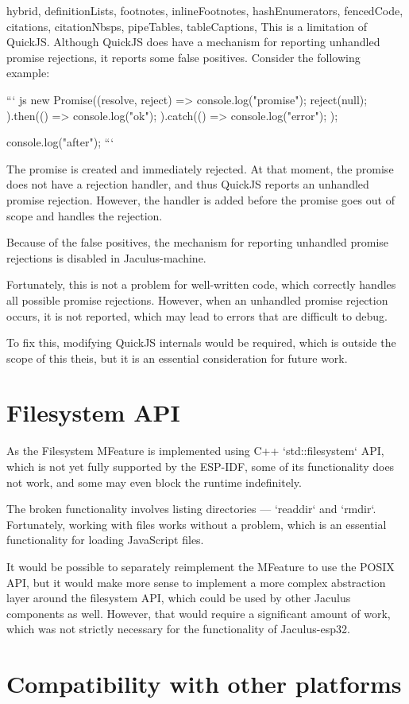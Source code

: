\begin{markdown*}{%
  hybrid,
  definitionLists,
  footnotes,
  inlineFootnotes,
  hashEnumerators,
  fencedCode,
  citations,
  citationNbsps,
  pipeTables,
  tableCaptions,
}
This is a limitation of QuickJS. Although QuickJS does have a mechanism for reporting unhandled promise rejections, it reports some false positives. Consider the following example:

``` js
new Promise((resolve, reject) => {
  console.log("promise");
  reject(null);
}).then(() => {
  console.log("ok");
}).catch(() => {
  console.log("error");
});

console.log("after");
```

The promise is created and immediately rejected. At that moment, the promise does not have a rejection handler, and thus QuickJS reports an unhandled promise rejection. However, the handler is added before the promise goes out of scope and handles the rejection.

Because of the false positives, the mechanism for reporting unhandled promise rejections is disabled in Jaculus-machine.

Fortunately, this is not a problem for well-written code, which correctly handles all possible promise rejections. However, when an unhandled promise rejection occurs, it is not reported, which may lead to errors that are difficult to debug.

To fix this, modifying QuickJS internals would be required, which is outside the scope of this theis, but it is an essential consideration for future work.


\section{Filesystem API}

As the Filesystem MFeature is implemented using C++ `std::filesystem` API, which is not yet fully supported by the ESP-IDF, some of its functionality does not work, and some may even block the runtime indefinitely.

The broken functionality involves listing directories --- `readdir` and `rmdir`. Fortunately, working with files works without a problem, which is an essential functionality for loading JavaScript files.

It would be possible to separately reimplement the MFeature to use the POSIX API, but it would make more sense to implement a more complex abstraction layer around the filesystem API, which could be used by other Jaculus components as well. However, that would require a significant amount of work, which was not strictly necessary for the functionality of Jaculus-esp32.

\section{Compatibility with other platforms}


\end{markdown*}
